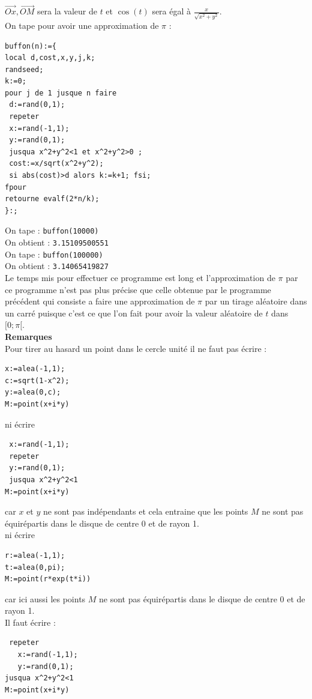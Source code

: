 \documentclass[a4paper,11pt]{book}
\begin{document}
$\overrightarrow{Ox},\overrightarrow{OM}$ sera la valeur de $t$ et $\cos(t)$ 
sera \'egal \`a $\displaystyle \frac{x}{\sqrt{x^2+y^2}}$.\\
On tape pour avoir une approximation de $\pi$ :
\begin{verbatim}
buffon(n):={
local d,cost,x,y,j,k;
randseed;
k:=0;
pour j de 1 jusque n faire
 d:=rand(0,1);
 repeter
 x:=rand(-1,1);
 y:=rand(0,1);
 jusqua x^2+y^2<1 et x^2+y^2>0 ;
 cost:=x/sqrt(x^2+y^2);
 si abs(cost)>d alors k:=k+1; fsi;
fpour
retourne evalf(2*n/k);
}:;
\end{verbatim}
On tape :
{\tt buffon(10000)}\\
On obtient :
{\tt 3.15109500551}\\
On tape :
{\tt buffon(100000)}\\
On obtient :
{\tt 3.14065419827}\\
Le temps mis pour effectuer ce programme est long et l'approximation de $\pi$ 
par ce programme n'est pas plus pr\'ecise que celle obtenue par le
programme pr\'ec\'edent qui consiste a faire une approximation de $\pi$ par un 
tirage al\'eatoire dans un carr\'e puisque c'est ce que l'on fait pour avoir la 
valeur al\'eatoire de $t$ dans $[0;\pi[$.\\
{\bf Remarques} \\
Pour tirer au hasard un point dans le cercle unit\'e il ne faut pas \'ecrire :
\begin{verbatim}
x:=alea(-1,1);
c:=sqrt(1-x^2);
y:=alea(0,c);
M:=point(x+i*y)
\end{verbatim}
ni \'ecrire 
\begin{verbatim}
 x:=rand(-1,1);
 repeter
 y:=rand(0,1);
 jusqua x^2+y^2<1 
M:=point(x+i*y)
\end{verbatim}
car $x$ et $y$ ne sont pas ind\'ependants et cela entraine que les points $M$ 
ne sont pas \'equir\'epartis dans le disque de centre 0 et de rayon 1.\\ 
ni \'ecrire 
\begin{verbatim}
r:=alea(-1,1);
t:=alea(0,pi);
M:=point(r*exp(t*i))
\end{verbatim}
car ici aussi les points $M$ ne sont pas \'equir\'epartis dans le disque de 
centre 0 et de rayon 1.\\
Il faut \'ecrire :
\begin{verbatim}
 repeter
   x:=rand(-1,1);
   y:=rand(0,1);
jusqua x^2+y^2<1 
M:=point(x+i*y)
\end{verbatim}
\end{document}
